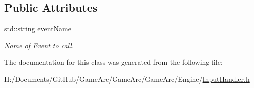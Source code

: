 \subsection*{Public Attributes}
\begin{DoxyCompactItemize}
\item 
\hypertarget{class_key_input_func_event_a18b0a8c56401b0e21cd0f2e4794e65a5}{std\+::string \hyperlink{class_key_input_func_event_a18b0a8c56401b0e21cd0f2e4794e65a5}{event\+Name}}\label{class_key_input_func_event_a18b0a8c56401b0e21cd0f2e4794e65a5}

\begin{DoxyCompactList}\small\item\em Name of \hyperlink{class_event}{Event} to call. \end{DoxyCompactList}\end{DoxyCompactItemize}


The documentation for this class was generated from the following file\+:\begin{DoxyCompactItemize}
\item 
H\+:/\+Documents/\+Git\+Hub/\+Game\+Arc/\+Game\+Arc/\+Game\+Arc/\+Engine/\hyperlink{_input_handler_8h}{Input\+Handler.\+h}\end{DoxyCompactItemize}
